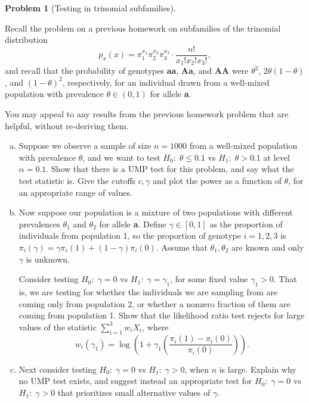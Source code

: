 \documentclass{article}
\theoremstyle{definition}
\newtheorem{problem}{Problem}
\begin{document}
\begin{problem}[Testing in trinomial subfamilies]
  \label{prob:trinomial-testing}

  Recall the problem on a previous homework on subfamilies of the trinomial distribution
  \[
  p_\pi(x) = \pi_1^{x_1}\pi_2^{x_2}\pi_3^{x_3} \cdot \frac{n!}{x_1! x_2! x_3!},
  \]
  and recall that the probability of genotypes {\bf aa}, {\bf Aa}, and {\bf AA} were $\theta^2$, $2\theta(1-\theta)$, and $(1-\theta)^2$, respectively, for an individual drawn from a well-mixed population with prevalence $\theta\in (0,1)$ for allele {\bf a}.

  You may appeal to any results from the previous homework problem that are helpful, without re-deriving them.

 \begin{enumerate}[(a)]

  \item Suppose we observe a sample of size $n = 1000$ from a well-mixed population with prevalence $\theta$, and we want to test $H_0:\;\theta \leq 0.1$ vs $H_1:\; \theta > 0.1$ at level $\alpha = 0.1$. Show that there is a UMP test for this problem, and say what the test statistic is. Give the cutoffs $c,\gamma$ and plot the power as a function of $\theta$, for an appropriate range of values.

    

  \item Now suppose our population is a mixture of two populations with different prevalences $\theta_1$ and $\theta_2$ for allele {\bf a}. Define $\gamma \in [0,1]$ as the proportion of individuals from population 1, so the proportion of genotype $i=1,2,3$ is $\pi_i(\gamma) = \gamma \pi_i(1) + (1-\gamma)\pi_i(0)$. Assume that $\theta_1,\theta_2$ are known and only $\gamma$ is unknown.

    Consider testing  $H_0:\;\gamma = 0$ vs $H_1:\;\gamma = \gamma_1$, for some fixed value $\gamma_1 > 0$. That is, we are testing for whether the individuals we are sampling from are coming only from population 2, or whether a nonzero fraction of them are coming from population 1. Show that the likelihood ratio test rejects for large values of the statistic  $\sum_{i=1}^3 w_iX_i$, where
    \[
    w_i(\gamma_1) = \log\left(1 + \gamma_1\left(\frac{\pi_i(1)-\pi_i(0)}{\pi_i(0)}\right)\right).
    \]

    

    \item Next consider testing  $H_0:\;\gamma = 0$ vs $H_1:\;\gamma >0$, when $n$ is large. Explain why no UMP test exists, and suggest instead an appropriate test for $H_0:\;\gamma = 0$ vs $H_1:\;\gamma > 0$ that prioritizes small alternative values of $\gamma$.


\end{enumerate}
\end{problem}
\end{document}
